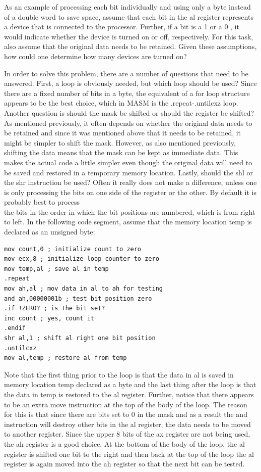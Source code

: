 \documentclass[10pt]{article}
\begin{document}
As an example of processing each bit individually and using only a byte instead of a double word to save space, assume that each bit in the al register represents a device that is connected to the processor. Further, if a bit is a 1 or a 0 , it would indicate whether the device is turned on or off, respectively. For this task, also assume that the original data needs to be retained. Given these assumptions, how could one determine how many devices are turned on?

In order to solve this problem, there are a number of questions that need to be answered. First, a loop is obviously needed, but which loop should be used? Since there are a fixed number of bits in a byte, the equivalent of a for loop structure appears to be the best choice, which in MASM is the .repeat-.untilcxz loop. Another question is should the mask be shifted or should the register be shifted? As mentioned previously, it often depends on whether the original data needs to be retained and since it was mentioned above that it needs to be retained, it might be simpler to shift the mask. However, as also mentioned previously, shifting the data means that the mask can be kept as immediate data. This makes the actual code a little simpler even though the original data will need to be saved and restored in a temporary memory location. Lastly, should the shl or the shr instruction be used? Often it really does not make a difference, unless one is only processing the bits on one side of the register or the other. By default it is probably best to process\\
the bits in the order in which the bit positions are numbered, which is from right to left. In the following code segment, assume that the memory location temp is declared as an unsigned byte:

\begin{verbatim}
mov count,0 ; initialize count to zero
mov ecx,8 ; initialize loop counter to zero
mov temp,al ; save al in temp
.repeat
mov ah,al ; mov data in al to ah for testing
and ah,00000001b ; test bit position zero
.if !ZERO? ; is the bit set?
inc count ; yes, count it
.endif
shr al,1 ; shift al right one bit position
.untilcxz
mov al,temp ; restore al from temp
\end{verbatim}

Note that the first thing prior to the loop is that the data in al is saved in memory location temp declared as a byte and the last thing after the loop is that the data in temp is restored to the al register. Further, notice that there appears to be an extra move instruction at the top of the body of the loop. The reason for this is that since there are bits set to 0 in the mask and as a result the and instruction will destroy other bits in the al register, the data needs to be moved to another register. Since the upper 8 bits of the ax register are not being used, the ah register is a good choice. At the bottom of the body of the loop, the al register is shifted one bit to the right and then back at the top of the loop the al register is again moved into the ah register so that the next bit can be tested.
\end{document}
